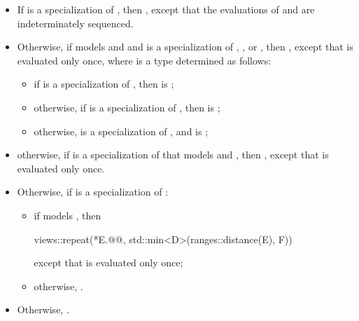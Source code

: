 \begin{itemize}
\item
If  is a specialization
of ,
then ,
except that the evaluations of  and 
are indeterminately sequenced.

\item
Otherwise, if  models
 and 
and is a specialization of
,
, or
,
then
,
except that  is evaluated only once,
where  is a type determined as follows:

\begin{itemize}
\item if  is a specialization of ,
then  is ;
\item otherwise, if  is a specialization of ,
then  is ;
\item otherwise,  is a specialization of , and
 is ;
\end{itemize}

\item
otherwise, if  is
a specialization of 
that models  and ,
then
,
except that  is evaluated only once.

\item
Otherwise, if  is
a specialization of :
\begin{itemize}
\item
if  models ,
then
\begin{codeblock}
views::repeat(*E.@@, std::min<D>(ranges::distance(E), F))
\end{codeblock}
except that  is evaluated only once;
\item
otherwise, .
\end{itemize}

\item
Otherwise, .
\end{itemize}

